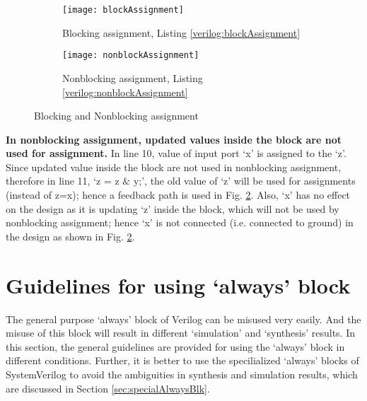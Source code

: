 \begin{figure}[t!]
	\centering
	\begin{subfigure}[t]{0.5\textwidth}
		\centering
		\texttt{[image: blockAssignment]}
		\caption{Blocking assignment, Listing \ref{verilog:blockAssignment}}
		\label{fig:blockAssignment}
	\end{subfigure}%
	\begin{subfigure}[t]{0.5\textwidth}
		\centering
		\texttt{[image: nonblockAssignment]}
		\caption{Nonblocking assignment, Listing \ref{verilog:nonblockAssignment}}
		\label{fig:nonblockAssignment}
	\end{subfigure}	
	\caption{Blocking and Nonblocking assignment}
	\label{fig:blockingNonblockingAssg}%
\end{figure}

\begin{explanation}
	\textbf{	In nonblocking assignment, updated values inside the block are not used for assignment.} In line 10, value of input port `x' is assigned to the `z'. Since updated value inside the block are not used in nonblocking assignment, therefore in line 11, `z = z $\&$ y;', the old value of `z' will be used for assignments (instead of z=x); hence a feedback path is used in Fig. \ref{fig:nonblockAssignment}. Also, `x' has no effect on the design as it is updating `z' inside the block, which will not be used by nonblocking assignment; hence `x' is not connected (i.e. connected to ground) in the design as shown in Fig. \ref{fig:nonblockAssignment}.
\end{explanation}



\section{Guidelines for using `always' block} \label{sec:guideAlwaysblock}
The general purpose `always' block of Verilog can be misused very easily. And the misuse of this block will result in different `simulation' and `synthesis' results. In this section, the general guidelines are provided for using the `always' block in different conditions. Further, it is better to use the specilialized `always' blocks of SystemVerilog to avoid the ambiguities in synthesis and simulation results, which are discussed in Section \ref{sec:specialAlwaysBlk}. 

